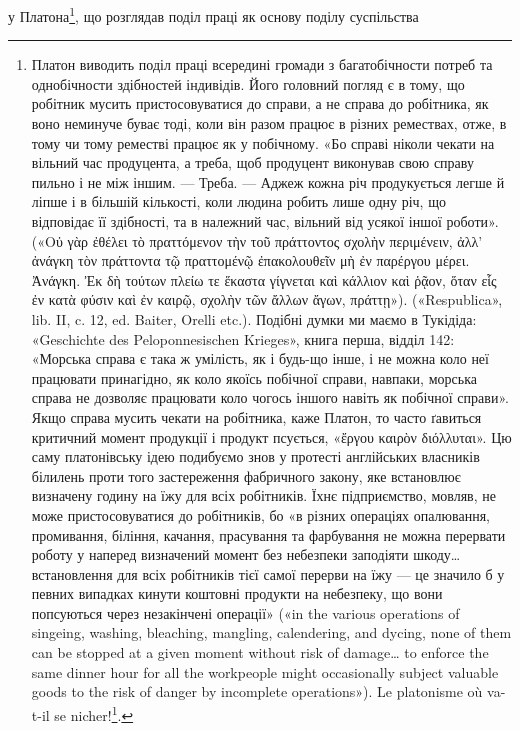 у Платона\footnote{
Платон виводить поділ праці всередині громади з багатобічности
потреб та однобічности здібностей індивідів. Його головний погляд є в
тому, що робітник мусить пристосовуватися до справи, а не справа до
робітника, як воно неминуче буває тоді, коли він разом працює в різних
ремествах, отже, в тому чи тому реместві працює як у побічному. «Бо
справі ніколи чекати на вільний час продуцента, а треба, щоб продуцент
виконував свою справу пильно і не між іншим. — Треба. — Аджеж кожна
річ продукується легше й ліпше і в більшій кількості, коли людина робить
лише одну річ, що відповідає її здібності, та в належний час, вільний
від усякої іншої роботи». («\textgreek{Οὐ γὰρ ἐθέλει τὸ πραττόμενον τὴν τοῦ πράττοντος σχολὴν περιμένειν, ἀλλ’
ἀνάγκη τὸν πράττοντα τῷ πραττομένῷ ἐπακολουθεῖν μὴ ἐν παρέργου μέρει. \textemdash{} Ἀνάγκη. Ἐκ δὴ τούτων πλείω
τε ἕκαστα γίγνεται καὶ κάλλιον καὶ ῥᾷον, ὅταν εἷς ἐν κατὰ φύσιν καὶ ἐν καιρῷ, σχολὴν τῶν ἄλλων ἄγων,
πράττῃ»}). («Respublica», lib. II, c. 12,
ed. Baiter, Orelli etc.). Подібні думки ми маємо в Тукідіда: «Geschichte
des Peloponnesischen Krieges», книга перша, відділ 142: «Морська справа
є така ж умілість, як і будь-що інше, і не можна коло неї працювати принагідно,
як коло якоїсь побічної справи, навпаки, морська справа не
дозволяє працювати коло чогось іншого навіть як побічної справи».
Якщо справа мусить чекати на робітника, каже Платон, то часто ґавиться
критичний момент продукції і продукт псується, «\textgreek{ἔργου καιρὸν διόλλυται}». Цю
саму платонівську ідею подибуємо знов у протесті англійських власників
білилень проти того застереження фабричного закону, яке встановлює визначену
годину на їжу для всіх робітників. Їхнє підприємство, мовляв, не
може пристосовуватися до робітників, бо «в різних операціях опалювання,
промивання, біління, качання, прасування та фарбування не можна
перервати роботу у наперед визначений момент без небезпеки заподіяти
шкоду\dots{} встановлення для всіх робітників тієї самої перерви на їжу —
це значило б у певних випадках кинути коштовні продукти на небезпеку,
що вони попсуються через незакінчені операції» («in the various operations
of singeing, washing, bleaching, mangling, calendering, and dycing,
none of them can be stopped at a given moment without risk of damage\dots{}
to enforce the same dinner hour for all the workpeople might occasionally
subject valuable goods to the risk of danger by incomplete operations»).
Le platonisme où va-t-il se nicher!\footnote*{
Куди ще може продертись платонізм! \emph{Ред.}
}.
}, що розглядав поділ праці як основу поділу суспільства

